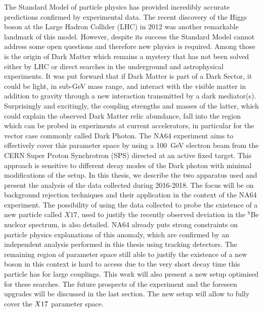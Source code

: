 The Standard Model of particle physics has provided incredibly accurate predictions confirmed by experimental data. The recent discovery of the Higgs boson at the Large Hadron Collider (LHC) in 2012 was another remarkable landmark of this model. However, despite its success the Standard Model cannot address some open questions and therefore new physics is required. Among those is the origin of Dark Matter which remains a mystery that has not been solved either by LHC or direct searches in the underground and astrophysical experiments. It was put forward that if Dark Matter is part of a Dark Sector, it could be light, in sub-\si{\giga\electronvolt} mass range, and interact with the visible matter in addition to gravity through a new interaction transmitted by a dark mediator(s).  
Surprisingly and excitingly, the coupling strengths and masses of the latter, which could explain the observed Dark Matter relic abundance, fall into the region  which can be probed in experiments at current accelerators,  in particular for the vector case commonly called Dark Photon. The NA64 experiment aims to effectively cover this parameter space by using a \SI{100}{\giga\electronvolt} electron beam from the CERN Super Proton Synchrotron (SPS) directed at an active fixed target. This approach is sensitive to different decay modes of the Dark photon with minimal modifications of the setup. In this thesis, we describe the two apparatus used and present the analysis of the data collected during 2016-2018. The focus will be on background rejection techniques and their application in the context of the NA64 experiment. The possibility of using the data collected to probe the existence of a new particle called $X17$, used to justify the recently observed deviation in the $^8$Be nuclear spectrum, is also detailed. NA64 already puts strong constraints on particle physics explanations of this anomaly, which are confirmed by an independent analysis performed in this thesis using tracking detectors. The remaining region of parameter space still able to justify the existence of a new boson in this context is hard to access due to the very short decay time this particle has for large couplings. This work will also present a new setup optimised for these searches. The future prospects of the experiment and the foreseen upgrades will be discussed in the last section. The new setup will allow to fully cover the $X17$ parameter space.
